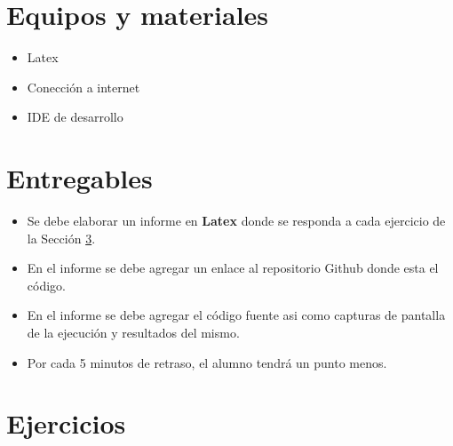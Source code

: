 \documentclass{article}
\begin{document}
	\section{Equipos y materiales}
	\begin{itemize}
		\item Latex
		\item Conección a internet 
		\item IDE de desarrollo
	\end{itemize}

	\section{Entregables}
	\begin{itemize}		
		\item Se debe elaborar un informe en \textbf{Latex} donde se responda a cada ejercicio de la Sección \ref{sec:ejercicios}.
		\item En el informe se debe agregar un enlace al repositorio Github donde esta el código.
		\item En el informe se debe agregar el código fuente asi como capturas de pantalla de la ejecución y resultados del mismo.
		\item Por cada 5 minutos de retraso, el alumno tendrá un punto menos.
	\end{itemize}


	
	\clearpage
	
	\section{Ejercicios}\label{sec:ejercicios}	
	
\end{document}
